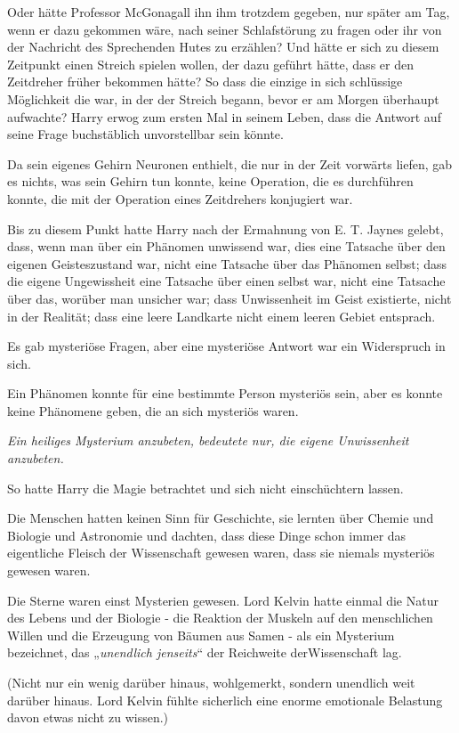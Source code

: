 {Oder hätte Professor McGonagall ihn ihm trotzdem gegeben, nur später am Tag, wenn er dazu gekommen wäre, nach seiner Schlafstörung zu fragen oder ihr von der Nachricht des Sprechenden Hutes zu erzählen? Und hätte er sich zu diesem Zeitpunkt einen Streich spielen wollen, der dazu geführt hätte, dass er den Zeitdreher früher bekommen hätte? So dass die einzige in sich schlüssige Möglichkeit die war, in der der Streich begann, bevor er am Morgen überhaupt aufwachte? Harry erwog zum ersten Mal in seinem Leben, dass die Antwort auf seine Frage buchstäblich unvorstellbar sein könnte.

Da sein eigenes Gehirn Neuronen enthielt, die nur in der Zeit vorwärts liefen, gab es nichts, was sein Gehirn tun konnte, keine Operation, die es durchführen konnte, die mit der Operation eines Zeitdrehers konjugiert war.

Bis zu diesem Punkt hatte Harry nach der Ermahnung von E. T. Jaynes gelebt, dass, wenn man über ein Phänomen unwissend war, dies eine Tatsache über den eigenen Geisteszustand war, nicht eine Tatsache über das Phänomen selbst; dass die eigene Ungewissheit eine Tatsache über einen selbst war, nicht eine Tatsache über das, worüber man unsicher war; dass Unwissenheit im Geist existierte, nicht in der Realität; dass eine leere Landkarte nicht einem leeren Gebiet entsprach.

Es gab mysteriöse Fragen, aber eine mysteriöse Antwort war ein Widerspruch in sich.

Ein Phänomen konnte für eine bestimmte Person mysteriös sein, aber es konnte keine Phänomene geben, die an sich mysteriös waren.

\emph{Ein heiliges Mysterium anzubeten, bedeutete nur, die eigene Unwissenheit anzubeten.}

So hatte Harry die Magie betrachtet und sich nicht einschüchtern lassen.

Die Menschen hatten keinen Sinn für Geschichte, sie lernten über Chemie und Biologie und Astronomie und dachten, dass diese Dinge schon immer das eigentliche Fleisch der Wissenschaft gewesen waren, dass sie niemals mysteriös gewesen waren.

Die Sterne waren einst Mysterien gewesen. Lord Kelvin hatte einmal die Natur des Lebens und der Biologie - die Reaktion der Muskeln auf den menschlichen Willen und die Erzeugung von Bäumen aus Samen - als ein Mysterium bezeichnet, das „\emph{unendlich jenseits}“ der Reichweite derWissenschaft lag.

(Nicht nur ein wenig darüber hinaus, wohlgemerkt, sondern unendlich weit darüber hinaus. Lord Kelvin fühlte sicherlich eine enorme emotionale Belastung davon etwas nicht zu wissen.)

}
